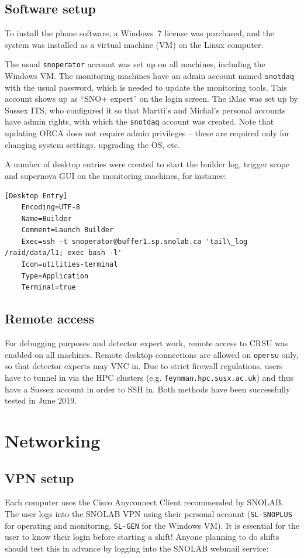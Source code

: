 \documentclass[a4paper,10pt]{article}
\begin{document}
\subsection{Software setup}
To install the phone software, a Windows~7 license was purchased, and the system was installed as a virtual machine (VM) on the Linux computer.

The usual {\tt snoperator} account was set up on all machines, including the Windows VM. The monitoring machines have an admin account named {\tt snotdaq} with the usual password, which is needed to update the monitoring tools. This account shows up as ``SNO+ expert'' on the login screen. The iMac was set up by Sussex ITS, who configured it so that Martti's and Michal's personal accounts have admin rights, with which the {\tt snotdaq} account was created. Note that updating ORCA does not require admin privileges -- these are required only for changing system settings, upgrading the OS, etc.

A number of desktop entries were created to start the builder log, trigger scope and supernova GUI on the monitoring machines, for instance:
{\small
\begin{Verbatim}[xleftmargin=-8mm]
	[Desktop Entry]
	Encoding=UTF-8
	Name=Builder
	Comment=Launch Builder
	Exec=ssh -t snoperator@buffer1.sp.snolab.ca 'tail\_log /raid/data/l1; exec bash -l'
	Icon=utilities-terminal
	Type=Application
	Terminal=true
\end{Verbatim}
}

\subsection{Remote access}
For debugging purposes and detector expert work, remote access to CRSU was enabled on all machines. Remote desktop connections are allowed on {\tt opersu} only, so that detector experts may VNC in. Due to strict firewall regulations, users have to tunnel in via the HPC clusters (e.g. {\tt feynman.hpc.susx.ac.uk}) and thus have a Sussex account in order to SSH in. Both methods have been successfully tested in June 2019.


\section{Networking}

\subsection{VPN setup}
Each computer uses the Cisco Anyconnect Client recommended by SNOLAB. The user logs into the SNOLAB VPN using their personal account ({\tt SL-SNOPLUS} for operating and monitoring, {\tt SL-GEN} for the Windows VM). It is essential for the user to know their login before starting a shift! Anyone planning to do shifts should test this in advance by logging into the SNOLAB webmail service: 
\end{document}
